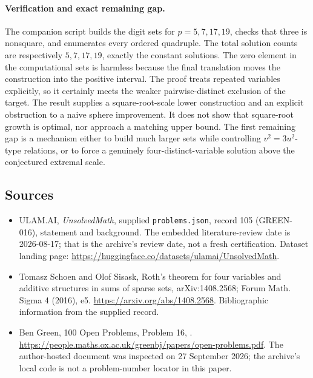\documentclass[11pt,a4paper]{article}
\begin{document}
\paragraph{Verification and exact remaining gap.}
The companion script builds the digit sets for $p=5,7,17,19$, checks that three is nonsquare, and enumerates every ordered quadruple. The total solution counts are respectively $5,7,17,19$, exactly the constant solutions. The zero element in the computational sets is harmless because the final translation moves the construction into the positive interval. The proof treats repeated variables explicitly, so it certainly meets the weaker pairwise-distinct exclusion of the target. The result supplies a square-root-scale lower construction and an explicit obstruction to a naive sphere improvement. It does not show that square-root growth is optimal, nor approach a matching upper bound. The first remaining gap is a mechanism either to build much larger sets while controlling $v^2=3u^2$-type relations, or to force a genuinely four-distinct-variable solution above the conjectured extremal scale.

\subsection{Sources}

{\small

\begin{itemize}

\item[\hypertarget{source:105:1}{S1}] ULAM.AI, \emph{UnsolvedMath}, supplied \texttt{problems.json}, record 105 (GREEN-016), statement and background. The embedded literature-review date is 2026-08-17; that is the archive’s review date, not a fresh certification. Dataset landing page: \url{https://huggingface.co/datasets/ulamai/UnsolvedMath}.

\item[\hypertarget{source:105:2}{S2}] Tomasz Schoen and Olof Sisask, Roth's theorem for four variables and additive structures in sums of sparse sets, arXiv:1408.2568; Forum Math. Sigma 4 (2016), e5. \url{https://arxiv.org/abs/1408.2568}. Bibliographic information from the supplied record.

\item[\hypertarget{source:105:3}{S3}] Ben Green, 100 Open Problems, Problem 16, . \url{https://people.maths.ox.ac.uk/greenbj/papers/open-problems.pdf}. The author-hosted document was inspected on 27 September 2026; the archive’s local code is not a problem-number locator in this paper.

\end{itemize}

}

\label{end:105}
\end{document}
